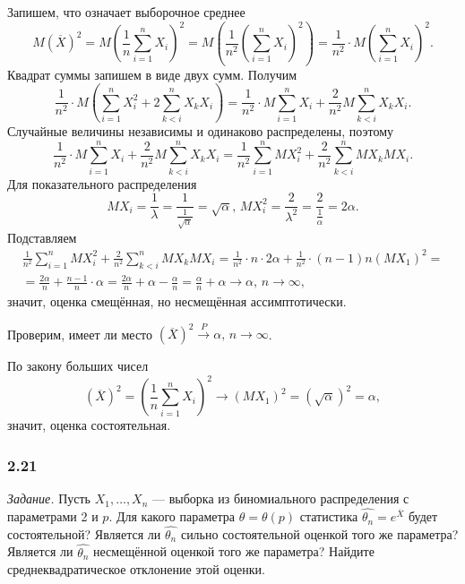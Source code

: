 Запишем, что означает выборочное среднее
$$M \left( \overline{X} \right)^2 =
  M \left( \frac{1}{n} \sum \limits_{i = 1}^n X_i \right)^2 =
  M \left( \frac{1}{n^2} \left( \sum \limits_{i = 1}^n X_i \right)^2 \right) =
  \frac{1}{n^2} \cdot M \left( \sum \limits_{i = 1}^n X_i \right)^2.$$
Квадрат суммы запишем в виде двух сумм.
Получим
$$ \frac{1}{n^2} \cdot
  M \left( \sum \limits_{i = 1}^n X_i^2 + 2 \sum \limits_{k < i}^n X_k X_i \right) =
  \frac{1}{n^2} \cdot M \sum \limits_{i = 1}^n X_i +
  \frac{2}{n^2} M \sum \limits_{k < i}^n X_k X_i.$$
Случайные величины независимы и одинаково распределены, поэтому
$$ \frac{1}{n^2} \cdot M \sum \limits_{i = 1}^n X_i +
  \frac{2}{n^2} M \sum \limits_{k < i}^n X_k X_i =
  \frac{1}{n^2} \sum \limits_{i = 1}^n MX_i^2 + \frac{2}{n^2} \sum \limits_{k < i}^n MX_k MX_i.$$
Для показательного распределения
$$MX_i = \frac{1}{ \lambda } = \frac{1}{ \frac{1}{ \sqrt{ \alpha }}} = \sqrt{ \alpha }, \,
  MX_i^2 = \frac{2}{ \lambda^2} = \frac{2}{ \frac{1}{ \alpha }} = 2 \alpha.$$
Подставляем
\begin{equation*}
  \begin{split}
    \frac{1}{n^2} \sum \limits_{i = 1}^n MX_i^2 + \frac{2}{n^2} \sum \limits_{k < i}^n MX_k MX_i =
    \frac{1}{n^2} \cdot n \cdot 2 \alpha +
    \frac{1}{n^2} \cdot \left( n - 1 \right) n \left( MX_1 \right)^2 = \\
    = \frac{2 \alpha }{n} + \frac{n - 1}{n} \cdot \alpha =
    \frac{2 \alpha }{n} + \alpha - \frac{ \alpha }{n} =
    \frac{ \alpha }{n} + \alpha \to \alpha, \, n \to \infty,
  \end{split}
\end{equation*}
значит, оценка смещённая, но несмещённая ассимптотически.

Проверим, имеет ли место
$ \left( \overline{X} \right)^2 \overset{P}{ \to } \alpha, \,
  n \to \infty $.

По закону больших чисел
$$ \left( \overline{X} \right)^2 =
  \left( \frac{1}{n} \sum \limits_{i = 1}^n X_i \right)^2 \to
  \left( MX_1 \right)^2 =
  \left( \sqrt{ \alpha } \right)^2 =
  \alpha,$$
значит, оценка состоятельная.

\subsubsection*{2.21}

\textit{Задание.}
Пусть $X_1, \dotsc, X_n$ --- выборка из биномиального распределения с параметрами 2 и $p$.
Для какого параметра $ \theta = \theta \left( p \right) $ статистика
$ \hat{ \theta_n} = e^{ \overline{X}}$ будет состоятельной?
Является ли $ \hat{ \theta_n}$ сильно состоятельной оценкой того же параметра?
Является ли $ \hat{ \theta_n}$ несмещённой оценкой того же параметра?
Найдите среднеквадратическое отклонение этой оценки.

